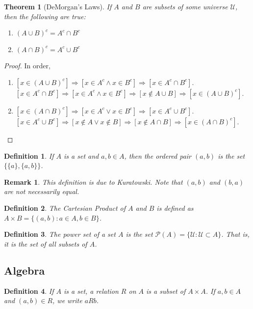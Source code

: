 \documentclass[12pt,oneside]{book}
\theoremstyle{mystyle}
\newtheorem{theorem}{Theorem}[section]
\newtheorem{definition}{Definition}[section]
\newtheorem{remark}{Remark}[section]
\begin{document}
\begin{theorem}[DeMorgan's Laws]
If $A$ and $B$ are subsets of some universe $\mathcal{U}$, then the following are true:
\begin{enumerate}
\item $(A\cup B)^c = A^c \cap B^c$
\item $(A\cap B)^c = A^c \cup B^c$
\end{enumerate}
\end{theorem}
\begin{proof}
In order,
\begin{enumerate}
\item $[x\in (A\cup B)^c]\Rightarrow [x\in A^c\land x\in B^c]\Rightarrow [x\in A^c\cap B^c]$. $[x\in A^c \cap B^c]\Rightarrow [x\in A^c\land x\in B^c]\Rightarrow [x\notin A\cup B]\Rightarrow [x\in (A\cup B)^c]$.
\item $[x\in (A\cap B)^c]\Rightarrow [x\in A^c\lor x\in B^c]\Rightarrow [x\in A^c \cup B^c]$. $[x\in A^c \cup B^c]\Rightarrow [x\notin A\lor x\notin B]\Rightarrow [x\notin A\cap B]\Rightarrow [x\in (A\cap B)^c]$.
\end{enumerate}
\end{proof}

\begin{definition}
If $A$ is a set and $a,b\in A$, then the ordered pair $(a,b)$ is the set $\{\{a\},\{a,b\}\}$.
\end{definition}

\begin{remark}
This definition is due to Kuratowski. Note that $(a,b)$ and $(b,a)$ are not necessarily equal.
\end{remark}

\begin{definition}
The Cartesian Product of $A$ and $B$ is defined as $A\times B = \{(a,b):a\in A, b\in B\}$.
\end{definition}

\begin{definition}
The power set of a set $A$ is the set $\mathcal{P}(A) = \{\mathcal{U}:\mathcal{U}\subset A\}$. That is, it is the set of all subsets of $A$.
\end{definition}
%
\subsection{Algebra}
%
\begin{definition}
If $A$ is a set, a relation $R$ on $A$ is a subset of $A\times A$. If $a,b\in A$ and $(a,b)\in R$, we write $aR b$.
\end{definition}
\end{document}
